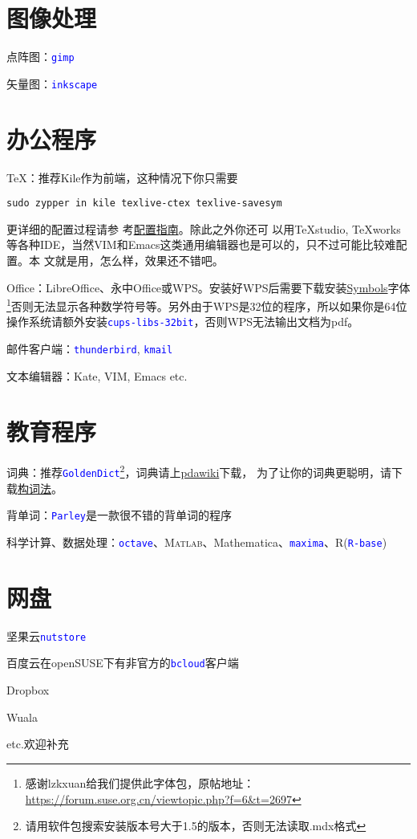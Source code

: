 \documentclass[10pt,openany]{book}
\newcommand{\soft}[1]{\texttt{\textcolor{blue}{#1}}}
\begin{document}
\section{图像处理}
点阵图：\soft{gimp}

矢量图：\soft{inkscape}
\section{办公程序}
\TeX ：推荐Kile作为前端，这种情况下你只需要
\begin{Verbatim}[formatcom=\color{codecolor}]
    sudo zypper in kile texlive-ctex texlive-savesym
\end{Verbatim}
更详细的配置过程请参
考\href{https://forum.suse.org.cn/viewtopic.php?f=6&t=2392&p=18750}{配置指南}。除此之外你还可
以用\TeX studio, \TeX works等各种IDE，当然VIM和Emacs这类通用编辑器也是可以的，只不过可能比较难配置。本
文就是用，怎么样，效果还不错吧。

Office：LibreOffice、永中Office或WPS。安装好WPS后需要下载安装\href{http://pan.baidu.com/s/1mgC3A0C}{Symbols}字体\footnote{感谢lzkxuan给我们提供此字体包，原帖地址：\url{https://forum.suse.org.cn/viewtopic.php?f=6&t=2697}}否则无法显示各种数学符号等。另外由于WPS是32位的程序，所以如果你是64位操作系统请额外安装\soft{cups-libs-32bit}，否则WPS无法输出文档为pdf。

邮件客户端：\soft{thunderbird}, \soft{kmail}

文本编辑器：Kate, VIM, Emacs etc.
\section{教育程序}
词典：推荐\soft{GoldenDict}\footnote{请用软件包搜索安装版本号大于1.5的版本，否则无法读取.mdx格式}，词典请上\href{http://pdawiki.com/forum/forum.php}{pdawiki}下载，
为了让你的词典更聪明，请下载\href{https://zpj.blog.ustc.edu.cn/wp-content/uploads/2014/02/wordsrule.tar.gz}{构词法}。

背单词：\soft{Parley}是一款很不错的背单词的程序%

科学计算、数据处理：\soft{octave}、\textsc{Matlab}、Mathematica、\soft{maxima}、R(\soft{R-base})
\section{网盘}
\begin{compactitem}
 \item 坚果云\soft{nutstore}
 \item 百度云在openSUSE下有非官方的\soft{bcloud}客户端
 \item Dropbox
 \item Wuala
 \item etc.欢迎补充
\end{compactitem}
\end{document}
